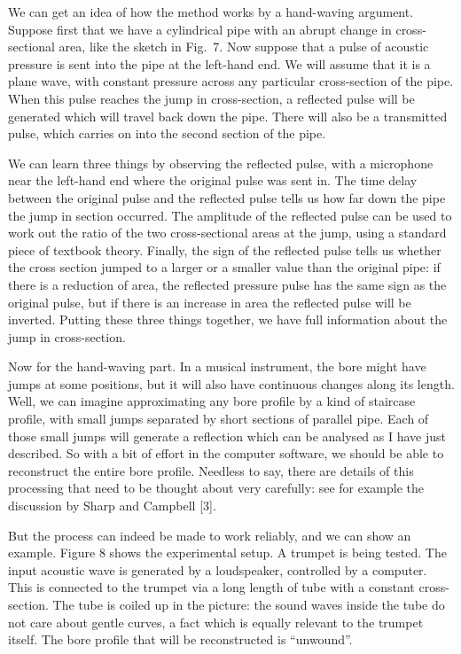   We can get an idea of how the method works by a hand-waving argument. Suppose 
  first that we have a cylindrical pipe with an abrupt change in 
  cross-sectional area, like the sketch in Fig.\ 7. Now suppose that a pulse of 
  acoustic pressure is sent into the pipe at the left-hand end. We will assume 
  that it is a plane wave, with constant pressure across any particular 
  cross-section of the pipe. When this pulse reaches the jump in cross-section, 
  a reflected pulse will be generated which will travel back down the pipe. 
  There will also be a transmitted pulse, which carries on into the second 
  section of the pipe. 

  We can learn three things by observing the reflected pulse, with a microphone 
  near the left-hand end where the original pulse was sent in. The time delay 
  between the original pulse and the reflected pulse tells us how far down the 
  pipe the jump in section occurred. The amplitude of the reflected pulse can 
  be used to work out the ratio of the two cross-sectional areas at the jump, 
  using a standard piece of textbook theory. Finally, the sign of the reflected 
  pulse tells us whether the cross section jumped to a larger or a smaller 
  value than the original pipe: if there is a reduction of area, the reflected 
  pressure pulse has the same sign as the original pulse, but if there is an 
  increase in area the reflected pulse will be inverted. Putting these three 
  things together, we have full information about the jump in cross-section. 

  Now for the hand-waving part. In a musical instrument, the bore might have 
  jumps at some positions, but it will also have continuous changes along its 
  length. Well, we can imagine approximating any bore profile by a kind of 
  staircase profile, with small jumps separated by short sections of parallel 
  pipe. Each of those small jumps will generate a reflection which can be 
  analysed as I have just described. So with a bit of effort in the computer 
  software, we should be able to reconstruct the entire bore profile. Needless 
  to say, there are details of this processing that need to be thought about 
  very carefully: see for example the discussion by Sharp and Campbell [3]. 

  But the process can indeed be made to work reliably, and we can show an 
  example. Figure 8 shows the experimental setup. A trumpet is being tested. 
  The input acoustic wave is generated by a loudspeaker, controlled by a 
  computer. This is connected to the trumpet via a long length of tube with a 
  constant cross-section. The tube is coiled up in the picture: the sound waves 
  inside the tube do not care about gentle curves, a fact which is equally 
  relevant to the trumpet itself. The bore profile that will be reconstructed 
  is “unwound”. 

